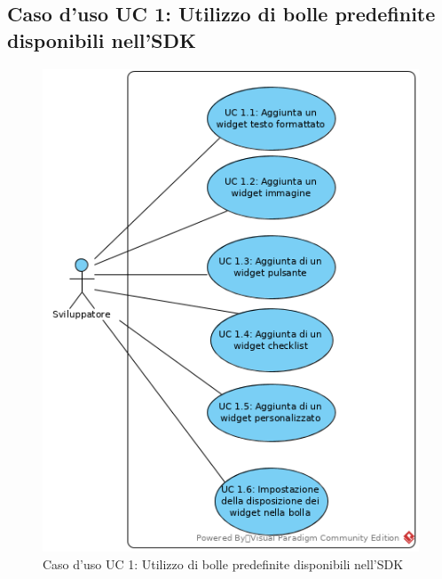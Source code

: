 \subsection{Caso d'uso UC 1: Utilizzo di bolle predefinite disponibili nell'SDK}
\label{Caso d'uso UC 1: Utilizzo di bolle predefinite disponibili nell'SDK}
\begin{figure}[ht]
	\centering
	\includegraphics[scale=0.80]{Usecases/img/UC1.png}
	\caption{Caso d'uso UC 1: Utilizzo di bolle predefinite disponibili nell'SDK}
\end{figure}

